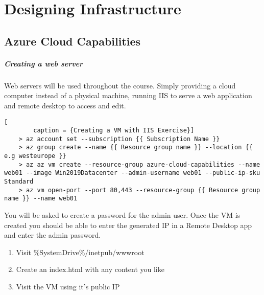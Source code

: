 \documentclass[a4paper,14pt]{report}
\author{Hugh McKenna}
\begin{document}
    \chapter{Designing Infrastructure}

    \section{Azure Cloud Capabilities}

    \paragraph{Creating a web server}
    Web servers will be used throughout the course. Simply providing a cloud computer instead of a
    physical machine, running IIS to serve a web application and remote desktop to access and edit.

    \begin{lstlisting}[
        caption = {Creating a VM with IIS Exercise}]
    > az account set --subscription {{ Subscription Name }}
    > az group create --name {{ Resource group name }} --location {{ e.g westeurope }}
    > az az vm create --resource-group azure-cloud-capabilities --name web01 --image Win2019Datacenter --admin-username web01 --public-ip-sku Standard
    > az vm open-port --port 80,443 --resource-group {{ Resource group name }} --name web01
    \end{lstlisting}

    You will be asked to create a password for the admin user. Once the VM is created you should be able to enter the generated IP in a Remote Desktop app and enter the admin password.
    \begin{enumerate}
        \item Visit \%SystemDrive\%/inetpub/wwwroot
        \item Create an index.html with any content you like
        \item Visit the VM using it's public IP
    \end{enumerate}
\end{document}
